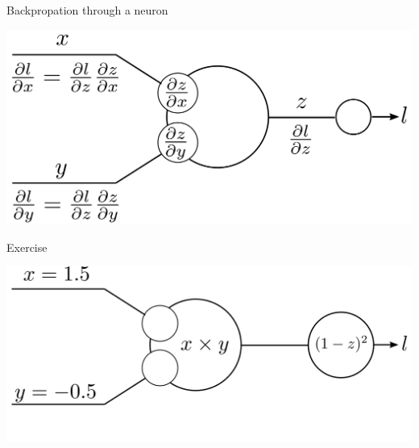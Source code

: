 \documentclass[xcolor=pdftex,dvipsnames,table,mathserif]{beamer}
\begin{document}
\begin{frame}

\end{frame}

\begin{frame}{Backpropation through a neuron}

\includegraphics[width=\textwidth]{bp_2_1_neuron.png}

\end{frame}


\begin{frame}{Exercise}

\includegraphics[width=\textwidth]{bp_2_1_neuron_exo.png}

\end{frame}
\end{document}
